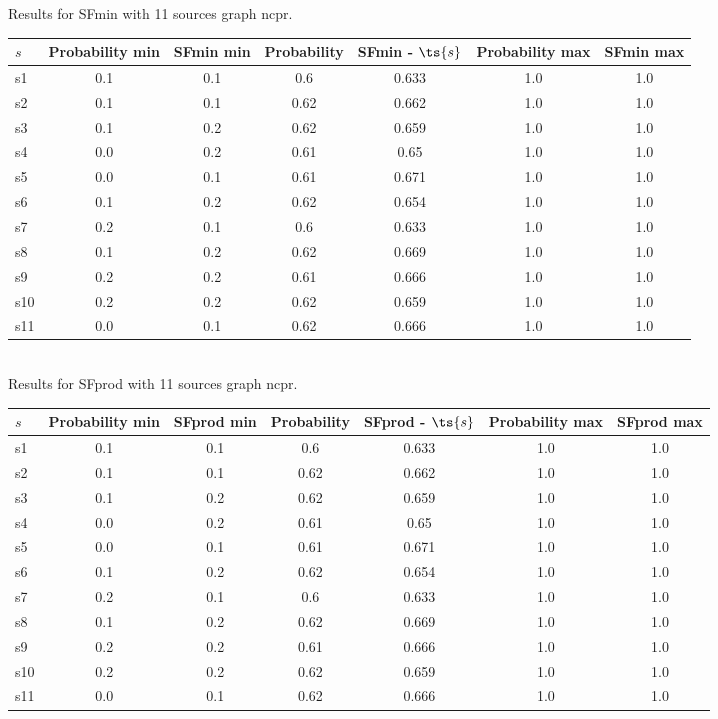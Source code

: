 \documentclass{article}
\begin{document}
\noindent Results for SFmin with 11 sources graph ncpr.

\noindent\begin{tabular}{|l|c|c|c|c|c|c|}
\hline
$s$& Probability min & SFmin min & Probability & SFmin - $\ts{s}$ & Probability max & SFmin max\\
\hline
s1 &0.1 & 0.1 & 0.6 & 0.633 & 1.0 & 1.0\\
\hline
s2 &0.1 & 0.1 & 0.62 & 0.662 & 1.0 & 1.0\\
\hline
s3 &0.1 & 0.2 & 0.62 & 0.659 & 1.0 & 1.0\\
\hline
s4 &0.0 & 0.2 & 0.61 & 0.65 & 1.0 & 1.0\\
\hline
s5 &0.0 & 0.1 & 0.61 & 0.671 & 1.0 & 1.0\\
\hline
s6 &0.1 & 0.2 & 0.62 & 0.654 & 1.0 & 1.0\\
\hline
s7 &0.2 & 0.1 & 0.6 & 0.633 & 1.0 & 1.0\\
\hline
s8 &0.1 & 0.2 & 0.62 & 0.669 & 1.0 & 1.0\\
\hline
s9 &0.2 & 0.2 & 0.61 & 0.666 & 1.0 & 1.0\\
\hline
s10 &0.2 & 0.2 & 0.62 & 0.659 & 1.0 & 1.0\\
\hline
s11 &0.0 & 0.1 & 0.62 & 0.666 & 1.0 & 1.0\\
\hline
\end{tabular}\\

\noindent Results for SFprod with 11 sources graph ncpr.

\noindent\begin{tabular}{|l|c|c|c|c|c|c|}
\hline
$s$& Probability min & SFprod min & Probability & SFprod - $\ts{s}$ & Probability max & SFprod max\\
\hline
s1 &0.1 & 0.1 & 0.6 & 0.633 & 1.0 & 1.0\\
\hline
s2 &0.1 & 0.1 & 0.62 & 0.662 & 1.0 & 1.0\\
\hline
s3 &0.1 & 0.2 & 0.62 & 0.659 & 1.0 & 1.0\\
\hline
s4 &0.0 & 0.2 & 0.61 & 0.65 & 1.0 & 1.0\\
\hline
s5 &0.0 & 0.1 & 0.61 & 0.671 & 1.0 & 1.0\\
\hline
s6 &0.1 & 0.2 & 0.62 & 0.654 & 1.0 & 1.0\\
\hline
s7 &0.2 & 0.1 & 0.6 & 0.633 & 1.0 & 1.0\\
\hline
s8 &0.1 & 0.2 & 0.62 & 0.669 & 1.0 & 1.0\\
\hline
s9 &0.2 & 0.2 & 0.61 & 0.666 & 1.0 & 1.0\\
\hline
s10 &0.2 & 0.2 & 0.62 & 0.659 & 1.0 & 1.0\\
\hline
s11 &0.0 & 0.1 & 0.62 & 0.666 & 1.0 & 1.0\\
\hline
\end{tabular}\\
\end{document}
